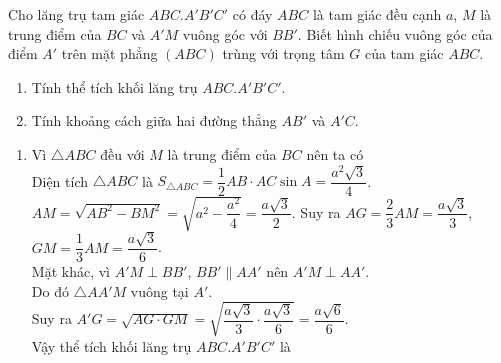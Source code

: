 \begin{bt}%
	Cho lăng trụ tam giác $ABC.A'B'C'$ có đáy $ABC$ là tam giác đều cạnh $a$, $M$ là trung điểm của $BC$ và $A'M$ vuông góc với $BB'$. Biết hình chiếu vuông góc của điểm $A'$ trên mặt phẳng $(ABC)$ trùng với trọng tâm $G$ của tam giác $ABC$.
\begin{enumerate}
		\item Tính thể tích khối lăng trụ $ABC.A'B'C'$.
		\item Tính khoảng cách giữa hai đường thẳng $AB'$ và $A'C$.
\end{enumerate}
\loigiai
{
\begin{center}
\end{center}
\begin{enumerate}
	\item Vì $\triangle ABC$ đều với $M$ là trung điểm của $BC$ nên ta có\\
	Diện tích $\triangle ABC$ là $S_{\triangle ABC}= \dfrac{1}{2} AB\cdot AC \sin A = \dfrac{a^2\sqrt{3}}{4}$.\\
	$AM= \sqrt{AB^2-BM^2}= \sqrt{a^2-\dfrac{a^2}{4}}= \dfrac{a\sqrt{3}}{2}$. Suy ra $AG= \dfrac{2}{3}AM= \dfrac{a\sqrt{3}}{3}$, $GM= \dfrac{1}{3}AM= \dfrac{a\sqrt{3}}{6}$.\\
	Mặt khác, vì $A'M\perp BB'$, $BB'\parallel AA'$ nên $A'M \perp AA'$.\\
	Do đó $\triangle AA'M$ vuông tại $A'$.\\
	Suy ra $A'G= \sqrt{AG\cdot GM}= \sqrt{\dfrac{a\sqrt{3}}{3} \cdot \dfrac{a\sqrt{3}}{6}}= \dfrac{a\sqrt{6}}{6}$.\\
	Vậy thể tích khối lăng trụ $ABC.A'B'C'$ là

\end{enumerate}}
\end{bt}

